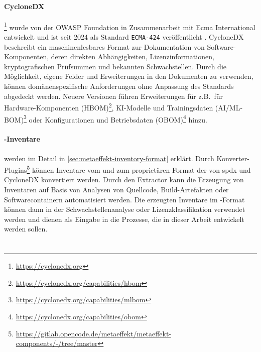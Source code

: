 \paragraph{CycloneDX}\footnote{\url{https://cyclonedx.org}}
wurde von der OWASP Foundation in Zusammenarbeit mit Ecma International entwickelt und ist seit 2024 als Standard \texttt{ECMA-424} veröffentlicht \autocite{CycloneDX2024Spec, ecma424:2024}.
CycloneDX beschreibt ein maschinenlesbares Format zur Dokumentation von Software-Komponenten, deren direkten Abhängigkeiten, Lizenzinformationen, kryptografischen Prüfsummen und bekannten Schwachstellen.
Durch die Möglichkeit, eigene Felder und Erweiterungen in den Dokumenten zu verwenden, können domänenspezifische Anforderungen ohne Anpassung des Standards abgedeckt werden.
Neuere Versionen führen Erweiterungen für z.B.\ für Hardware-Komponenten (HBOM)\footnote{\url{https://cyclonedx.org/capabilities/hbom}}, KI-Modelle und Trainingsdaten (AI/ML-BOM)\footnote{\url{https://cyclonedx.org/capabilities/mlbom}} oder Konfigurationen und Betriebsdaten (OBOM)\footnote{\url{https://cyclonedx.org/capabilities/obom}} hinzu.

\paragraph{\metaeffekt-Inventare}
werden im Detail in \autoref{sec:metaeffekt-inventory-format} erklärt.
Durch Konverter-Plugins\footnote{\url{https://gitlab.opencode.de/metaeffekt/metaeffekt-components/-/tree/master}} können Inventare vom und zum proprietären Format der \metaeffektsp von \acrshort{spdx} und CycloneDX konvertiert werden.
Durch den \metaeffektsp Extractor kann die Erzeugung von Inventaren auf Basis von Analysen von Quellcode, Build-Artefakten oder Softwarecontainern automatisiert werden.
Die erzeugten Inventare im \metaeffekt-Format können dann in der Schwachstellenanalyse oder Lizenzklassifikation verwendet werden und dienen als Eingabe in die Prozesse, die in dieser Arbeit entwickelt werden sollen.



\section{}\label{sec:grundlagen-vms}

